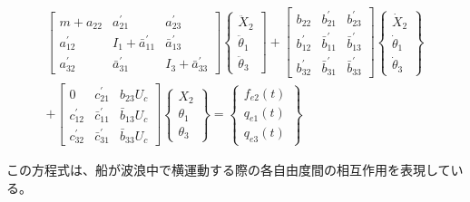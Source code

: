 \documentclass{article}
\begin{document}
$$
\begin{array}{c}
\left[\begin{array}{ccc}
m+a_{22} & a_{21}^{\prime} & a_{23}^{\prime} \\
a_{12}^{\prime} & I_{1}+\bar{a}_{11}^{\prime} & \bar{a}_{13}^{\prime} \\
a_{32}^{\prime} & \bar{a}_{31}^{\prime} & I_{3}+\bar{a}_{33}^{\prime}
\end{array}\right]\left\{\begin{array}{c}
\ddot{X}_{2} \\
\ddot{\theta}_{1} \\
\ddot{\theta}_{3}
\end{array}\right]+\left[\begin{array}{ccc}
b_{22} & b_{21}^{\prime} & b_{23}^{\prime} \\
b_{12}^{\prime} & \bar{b}_{11}^{\prime} & \bar{b}_{13}^{\prime} \\
b_{32}^{\prime} & \bar{b}_{31}^{\prime} & \bar{b}_{33}^{\prime}
\end{array}\right]\left\{\begin{array}{c}
\dot{X}_{2} \\
\dot{\theta}_{1} \\
\dot{\theta}_{3}
\end{array}\right\} \\
+\left[\begin{array}{ccc}
0 & c_{21}^{\prime} & b_{23} U_{c} \\
c_{12}^{\prime} & \bar{c}_{11}^{\prime} & \bar{b}_{13} U_{c} \\
c_{32}^{\prime} & \bar{c}_{31}^{\prime} & \bar{b}_{33} U_{c}
\end{array}\right]\left\{\begin{array}{c}
X_{2} \\
\theta_{1} \\
\theta_{3}
\end{array}\right\}=\left\{\begin{array}{c}
f_{e 2}(t) \\
q_{e 1}(t) \\
q_{e 3}(t)
\end{array}\right\}
\end{array}
$$

この方程式は、船が波浪中で横運動する際の各自由度間の相互作用を表現している。
\end{document}
